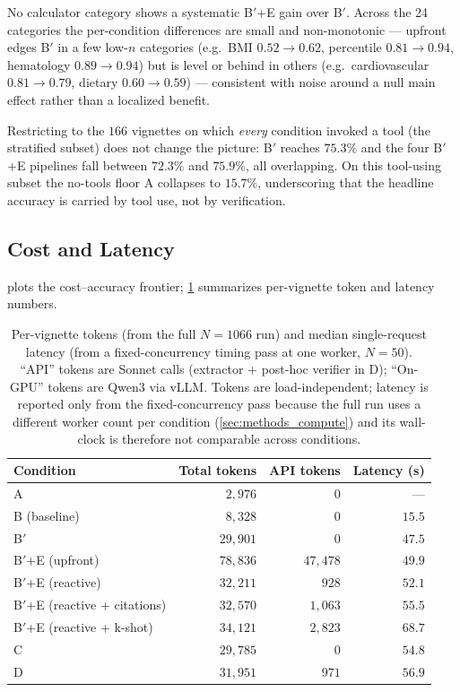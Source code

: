 No calculator category shows a systematic B$'$+E gain over B$'$. Across
the 24 categories the per-condition differences are small and
non-monotonic --- upfront edges B$'$ in a few low-$n$ categories (e.g.\
BMI $0.52\to0.62$, percentile $0.81\to0.94$, hematology $0.89\to0.94$)
but is level or behind in others (e.g.\ cardiovascular $0.81\to0.79$,
dietary $0.60\to0.59$) --- consistent with noise around a null main
effect rather than a localized benefit.

Restricting to the $166$ vignettes on which \emph{every} condition
invoked a tool (the stratified subset) does not change the picture:
B$'$ reaches $75.3\%$ and the four B$'$+E pipelines fall between
$72.3\%$ and $75.9\%$, all overlapping. On this tool-using subset the
no-tools floor A collapses to $15.7\%$, underscoring that the headline
accuracy is carried by tool use, not by verification.

\FloatBarrier
\subsection{Cost and Latency}
\label{sec:results_cost}

 plots the cost--accuracy frontier;
\cref{tab:cost} summarizes per-vignette token and latency numbers.

\begin{table}[!htbp]
  \centering
  \caption{Per-vignette tokens (from the full $N=1066$ run) and median
  single-request latency (from a fixed-concurrency timing pass at one
  worker, $N=50$). ``API'' tokens are Sonnet calls (extractor + post-hoc
  verifier in D); ``On-GPU'' tokens are Qwen3 via vLLM. Tokens are
  load-independent; latency is reported only from the fixed-concurrency
  pass because the full run uses a different worker count per condition
  (\cref{sec:methods_compute}) and its wall-clock is therefore not
  comparable across conditions.}
  \label{tab:cost}
  \begin{tabular}{lrrr}
    \toprule
    Condition & Total tokens & API tokens & Latency (s) \\
    \midrule
    A                                & $2{,}976$  & $0$       & ---    \\
    B (baseline)                     & $8{,}328$  & $0$       & $15.5$ \\
    B$'$                             & $29{,}901$ & $0$       & $47.5$ \\
    B$'$+E (upfront)                 & $78{,}836$ & $47{,}478$ & $49.9$ \\
    B$'$+E (reactive)                & $32{,}211$ & $928$     & $52.1$ \\
    B$'$+E (reactive + citations)    & $32{,}570$ & $1{,}063$ & $55.5$ \\
    B$'$+E (reactive + k-shot)       & $34{,}121$ & $2{,}823$ & $68.7$ \\
    C                                & $29{,}785$ & $0$       & $54.8$ \\
    D                                & $31{,}951$ & $971$     & $56.9$ \\
    \bottomrule
  \end{tabular}
\end{table}

